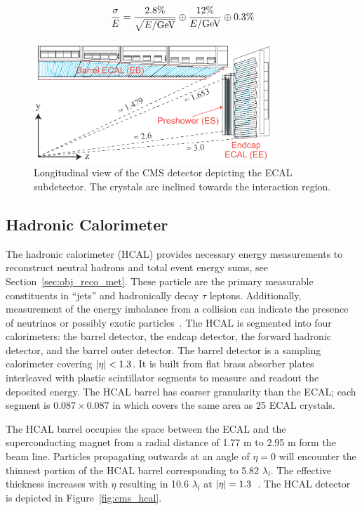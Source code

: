 \begin{equation}
\label{eqn:ecal_res}
\frac{\sigma}{E} = \frac{2.8\%}{\sqrt{E/\mathrm{GeV}}} \oplus \frac{12\%}{E/\mathrm{GeV}} \oplus 0.3\%
\end{equation}



\begin{figure}[htbp]
\centering
     \includegraphics[width=0.8\textwidth]{cms_and_lhc/plots/cms_ecal.png}
     \caption{
Longitudinal view of the CMS detector depicting the ECAL subdetector.
The crystals are inclined towards the interaction region.
     }
     \label{fig:cms_ecal}
\end{figure}



\subsection{Hadronic Calorimeter}
The hadronic calorimeter (HCAL) provides necessary energy measurements
to reconstruct neutral hadrons and total event energy sums, see Section~\ref{sec:obj_reco_met}. 
These particle are the primary measurable constituents in ``jets'' and hadronically decay $\tau$
leptons. Additionally, measurement of the energy imbalance from a collision
can indicate the presence of neutrinos or possibly exotic particles~\cite{CMS-Proposal}.
The HCAL is segmented into four calorimeters: the barrel detector, the endcap detector,
the forward hadronic detector, and the barrel outer detector. 
The barrel detector is a sampling calorimeter covering $\lvert\eta\rvert < 1.3$. It is built
from flat brass absorber plates interleaved with plastic scintillator segments to
measure and readout the deposited energy. The HCAL barrel has coarser granularity
than the ECAL; each segment is $0.087 \times 0.087$ in \etaphi which covers the
same area as 25 ECAL crystals.

The HCAL barrel occupies the space between the ECAL and the superconducting magnet
from a radial distance of 1.77 m to 2.95 m form the beam line. Particles propagating
outwards at an angle of $\eta = 0$ will encounter the thinnest portion of the
HCAL barrel corresponding to 5.82 $\lambda_{l}$. The effective thickness increases
with $\eta$ resulting in 10.6 $\lambda_{l}$ at $\lvert\eta\rvert = 1.3$~\cite{Chatrchyan:2008zzk}.
The HCAL detector is depicted in Figure~\ref{fig:cms_hcal}.

